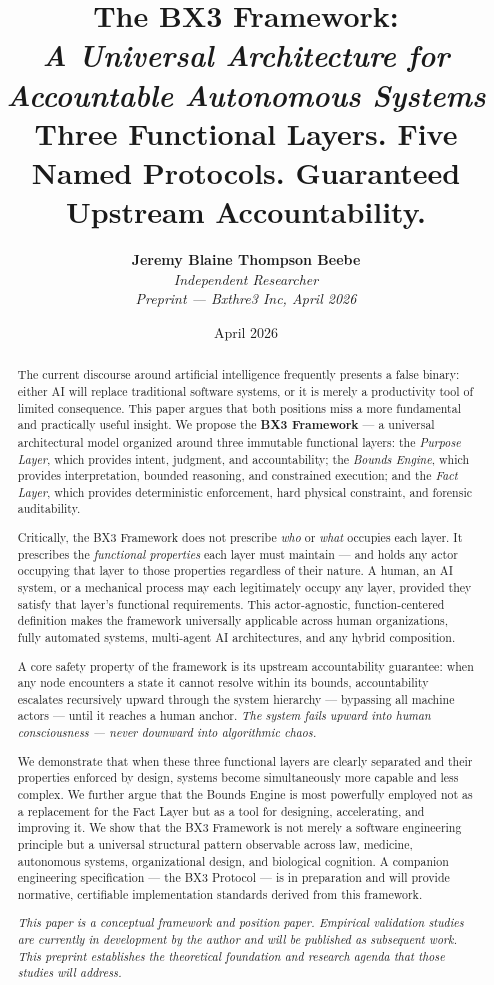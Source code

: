 \documentclass[12pt]{article}
\title{
    \vspace{1.2cm}
    {\LARGE \textbf{The BX3 Framework:}}\\[0.6em]
    {\large \textit{A Universal Architecture for Accountable Autonomous Systems}}\\[1.0em]
    {\normalsize Three Functional Layers. Five Named Protocols. Guaranteed Upstream Accountability.}
}
\author{
    \textbf{Jeremy Blaine Thompson Beebe}\\[0.2em]
    \textit{Independent Researcher}\\[0.3em]
    \textit{Preprint — Bxthre3 Inc, April 2026}\\[0.3em]
}
\date{April 2026}
\theoremstyle{plain}
\begin{document}
\maketitle
\thispagestyle{fancy}

\begin{abstract}
\noindent
The current discourse around artificial intelligence frequently presents a false binary: either AI will replace traditional software systems, or it is merely a productivity tool of limited consequence. This paper argues that both positions miss a more fundamental and practically useful insight. We propose the \textbf{BX3 Framework} --- a universal architectural model organized around three immutable functional layers: the \textit{Purpose Layer}, which provides intent, judgment, and accountability; the \textit{Bounds Engine}, which provides interpretation, bounded reasoning, and constrained execution; and the \textit{Fact Layer}, which provides deterministic enforcement, hard physical constraint, and forensic auditability.

Critically, the BX3 Framework does not prescribe \textit{who} or \textit{what} occupies each layer. It prescribes the \textit{functional properties} each layer must maintain --- and holds any actor occupying that layer to those properties regardless of their nature. A human, an AI system, or a mechanical process may each legitimately occupy any layer, provided they satisfy that layer's functional requirements. This actor-agnostic, function-centered definition makes the framework universally applicable across human organizations, fully automated systems, multi-agent AI architectures, and any hybrid composition.

A core safety property of the framework is its upstream accountability guarantee: when any node encounters a state it cannot resolve within its bounds, accountability escalates recursively upward through the system hierarchy --- bypassing all machine actors --- until it reaches a human anchor. \textit{The system fails upward into human consciousness --- never downward into algorithmic chaos.}

We demonstrate that when these three functional layers are clearly separated and their properties enforced by design, systems become simultaneously more capable and less complex. We further argue that the Bounds Engine is most powerfully employed not as a replacement for the Fact Layer but as a tool for designing, accelerating, and improving it. We show that the BX3 Framework is not merely a software engineering principle but a universal structural pattern observable across law, medicine, autonomous systems, organizational design, and biological cognition. A companion engineering specification --- the BX3 Protocol --- is in preparation and will provide normative, certifiable implementation standards derived from this framework.

\vspace{0.5em}
\noindent\textit{This paper is a conceptual framework and position paper. Empirical validation studies are currently in development by the author and will be published as subsequent work. This preprint establishes the theoretical foundation and research agenda that those studies will address.}
\end{abstract}
\end{document}
